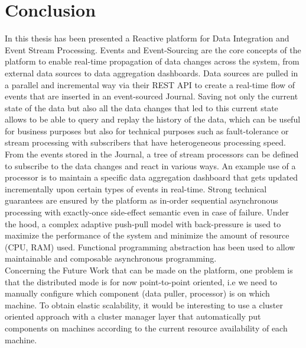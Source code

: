 \section{Conclusion}

In this thesis has been presented a Reactive platform for Data Integration and Event Stream Processing. Events and Event-Sourcing are the core concepts of the platform to enable 
real-time propagation of data changes across the system, from external data sources to data aggregation dashboards. Data sources are pulled in a parallel and incremental way via their REST API to create a real-time flow of events that are inserted in an event-sourced Journal. Saving not only the current state of the data but also all the data changes
that led to this current state allows to be able to query and replay the history of the data, which can be useful for business purposes but also for technical purposes such as fault-tolerance or stream processing with subscribers that have heterogeneous processing speed.
From the events stored in the Journal, a tree of stream processors can be defined to subscribe to the data changes and react in various ways. An example use of a processor is to maintain a specific data aggregation dashboard that gets updated incrementally upon certain types of events in real-time. Strong technical guarantees are ensured by the platform as in-order sequential asynchronous processing with exactly-once side-effect semantic even in case of failure. Under the hood, a complex adaptive push-pull model with back-pressure is used to maximize the performance of the system and minimize the amount of resource (CPU, RAM) used. Functional programming abstraction has been used to allow maintainable and composable asynchronous programming.
\\

Concerning the Future Work that can be made on the platform, one problem is that the distributed mode is for now point-to-point oriented, i.e we need to manually configure which component (data puller, processor) is on which machine. To obtain elastic scalability, it would be interesting to use a cluster oriented approach with a cluster manager layer that automatically put components on machines according to the current resource availability of each machine.


